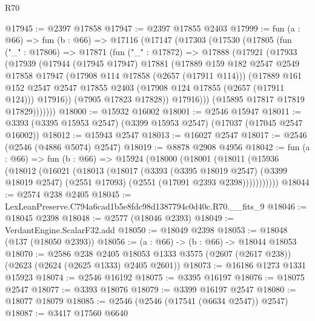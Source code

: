 \begin{lexlean}{R70}
\begin{coremodule}
@17945 := @2397 @17858
@17947 := @2397 @17855 @2403
@17999 := fun (a : @66) =>
  fun (b : @66) =>
  @17116
    (@17147
      (@17303
        (@17530
          (@17805
            (fun ("_" : @17806) =>
            @17871
              (fun ("_" : @17872) =>
              @17888
                (@17921
                  (@17933
                    (@17939
                      (@17944
                        (@17945 @17947)
                        @17881
                        (@17889
                          @159
                          @182
                          @2547
                          @2549
                          @17858
                          @17947
                          (@17908 @114 @17858 (@2657 (@17911 @114)))
                          (@17889
                            @161
                            @152
                            @2547
                            @2547
                            @17855
                            @2403
                            (@17908 @124 @17855 (@2657 (@17911 @124)))
                            @17916))
                        (@7905 @17823 @17828))
                      @17916)))
                (@15895 @17817 @17819 @17829)))))))
@18000 := @15932 @16002
@18001 := @2546 @15947
@18011 := @3393 (@3395 @15953 @2547) (@3399 @15953 @2547) (@17037 (@17045 @2547 @16002))
@18012 := @15943 @2547
@18013 := @16027 @2547
@18017 := @2546 (@2546 (@4886 @5074) @2547)
@18019 := @8878 @2908 @4956
@18042 := fun (a : @66) =>
  fun (b : @66) =>
  @15924
    (@18000
      (@18001
        (@18011
          (@15936
            (@18012
              (@16021
                (@18013
                  (@18017
                    (@3393
                      (@3395 @18019 @2547)
                      (@3399 @18019 @2547)
                      (@2551 @17093)
                      (@2551 (@17091 @2393 @2398)))))))))))
@18044 := @2574 @238 @2405
@18045 := LexLeanPreserve.C794a6cad1b5e8fdc98d1387794c0d40c.R70.__fits_9
@18046 := @18045 @2398
@18048 := @2577 (@18046 @2393)
@18049 := VerdantEngine.ScalarF32.add
@18050 := @18049 @2398
@18053 := @18048 (@137 (@18050 @2393))
@18056 := (a : @66) -> (b : @66) -> @18044 @18053
@18070 := @2586
    @238
    @2405
    @18053
    @1333
    @3575
    (@2607 (@2617 @238))
    (@2623 (@2624 (@2625 @1333) @2405 @2601))
@18073 := @16186 @1273 @1331 @15923
@18074 := @2546 @16192
@18075 := @3395 @16197
@18076 := @18075 @2547
@18077 := @3393 @18076
@18079 := @3399 @16197 @2547
@18080 := @18077 @18079
@18085 := @2546 (@2546 (@17541 (@6634 @2547)) @2547)
@18087 := @3417 @17560 @6640

\end{coremodule}
\end{lexlean}
